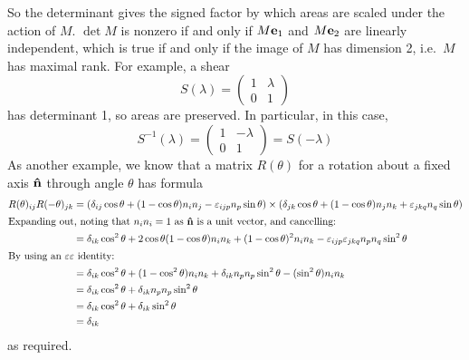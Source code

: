 So the determinant gives the signed factor by which areas are scaled under the action of \(M\).
\(\det M\) is nonzero if and only if \(M\vb e_1\) and \(M\vb e_2\) are linearly independent, which is true if and only if the image of \(M\) has dimension 2, i.e.\ \(M\) has maximal rank.
For example, a shear
\[
	S(\lambda) = \begin{pmatrix}
		1 & \lambda \\ 0 & 1
	\end{pmatrix}
\]
has determinant 1, so areas are preserved.
In particular, in this case,
\[
	S^{-1}(\lambda) = \begin{pmatrix}
		1 & -\lambda \\ 0 & 1
	\end{pmatrix} = S(-\lambda)
\]
As another example, we know that a matrix \(R(\theta)\) for a rotation about a fixed axis \(\vu{n}\) through angle \(\theta\) has formula
\begin{align*}
	R(\theta)_{ij} R(-\theta)_{jk} & = (\delta_{ij}\cos \theta + (1 - \cos \theta) n_i n_j - \varepsilon_{ijp}n_p \sin \theta) \times (\delta_{jk}\cos \theta + (1 - \cos \theta) n_j n_k + \varepsilon_{jkq}n_q \sin \theta) \\
	\intertext{Expanding out, noting that \(n_i n_i = 1\) as \(\vu{n}\) is a unit vector, and cancelling:}
	                               & = \delta_{ik} \cos^2 \theta + 2\cos \theta(1 - \cos \theta) n_i n_k + (1 - \cos \theta)^2n_i n_k - \varepsilon_{ijp}\varepsilon_{jkq} n_p n_q \sin^2 \theta                                \\
	\intertext{By using an \(\varepsilon\varepsilon\) identity:}
	                               & = \delta_{ik}\cos^2\theta + (1 - \cos^2 \theta)n_i n_k + \delta_{ik}n_p n_p \sin^2 \theta - (\sin^2 \theta)n_i n_k                                                                          \\
	                               & = \delta_{ik}\cos^2\theta + \delta_{ik}n_p n_p \sin^2 \theta                                                                                                                              \\
	                               & = \delta_{ik}\cos^2\theta + \delta_{ik} \sin^2 \theta                                                                                                                                    \\
	                               & = \delta_{ik}
\end{align*}
as required.
